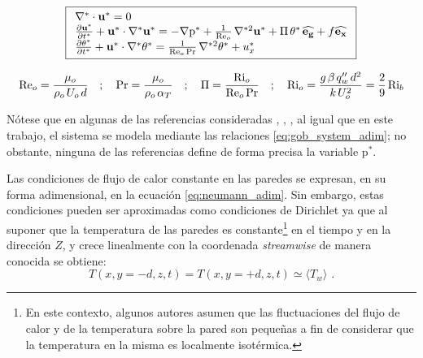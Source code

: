 \begin{equation}
\boxed{
\begin{array}{l}
    \nabla^* \cdot \mathbf{u^*} = 0 \\
    \frac{\partial \mathbf{u^*}}{\partial t^*} + \mathbf{u^*} \cdot \nabla^* \mathbf{u^*} = 
    -\nabla \text{p}^* + \frac{1}{\text{Re}_o} \hspace{0.5mm} \nabla^{*2} \mathbf{u^*} + \Pi \hspace{0.5mm} \theta^* \hspace{0.5mm} \mathbf{\widehat{e_g}} + f \mathbf{\widehat{e_x}}  \\
    \frac{\partial \theta^*}{\partial t^*} + \mathbf{u^*} \cdot \nabla^* \theta^* = 
    \frac{1}{\text{Re}_o \hspace{0.5mm} \text{Pr}} \hspace{0.5mm} \nabla^{*2} \theta^* + u_x^* 
\end{array}
}
\label{eq:gob_system_adim}
\end{equation}

\begin{equation}
\text{Re}_o = \frac{\mu_o}{\rho_o \hspace{0.5mm} U_o \hspace{0.5mm} d } \quad ; \quad \text{Pr}= \frac{\mu_o}{\rho_o \hspace{0.5mm} \alpha_{T}} \quad ; \quad \Pi = \frac{\text{Ri}_o}{\text{Re}_o \hspace{0.5mm} \text{Pr}} \quad ; \quad \text{Ri}_o = \frac{g \hspace{0.5mm} \beta \hspace{0.5mm} q''_w \hspace{0.5mm} d^2}{k \hspace{0.5mm} U_o^2} = \frac{2}{9} \hspace{0.5mm} \text{Ri}_b
\label{eq:num_adim}
\end{equation}

Nótese que en algunas de las referencias consideradas \cite{guo2022direct}, \cite{zhou2024direct}, \cite{tao1960}, al igual que en este trabajo, el sistema se modela \linebreak mediante las relaciones \ref{eq:gob_system_adim}; no obstante, ninguna de las referencias define de forma precisa la variable $\text{p}^*$.

Las condiciones de flujo de calor constante en las paredes se expresan, en su forma adimensional, en la ecuación \ref{eq:neumann_adim}. Sin embargo, estas condiciones pueden ser \linebreak aproximadas como condiciones de Dirichlet ya que al suponer que la temperatura de las paredes es constante\footnote{En este contexto, algunos autores \cite{kasagi1992direct} asumen que las fluctuaciones del flujo de calor y de la temperatura sobre la pared son pequeñas a fin de considerar que la temperatura en la misma es localmente isotérmica.} en el tiempo y en la dirección $Z$, y crece linealmente con la coordenada \textit{streamwise} de manera conocida se obtiene:
$$T(x,y=-d,z,t) = T(x,y=+d,z,t) \simeq \langle T_w \rangle \text{ .} $$

